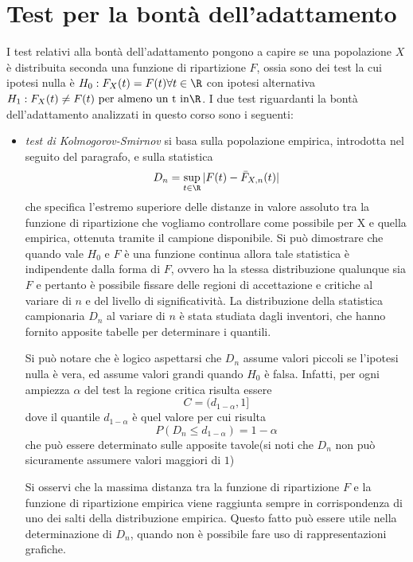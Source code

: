 \section{Test per la bontà dell'adattamento}
I test relativi alla bontà dell'adattamento pongono a capire se una popolazione $X$ è distribuita seconda una funzione
di ripartizione $F$, ossia sono dei test la cui ipotesi nulla è $H_0:F_X(t) = F(t) \forall t \in \R$ con ipotesi
alternativa $H_1:F_X(t) \neq F(t) \mbox{ per almeno un t in} \R$.\newline
I due test riguardanti la bontà dell'adattamento analizzati in questo corso sono i seguenti:
\begin{itemize}
    \item \emph{test di Kolmogorov-Smirnov} si basa sulla popolazione empirica, introdotta nel seguito del paragrafo, e
        sulla statistica
        \[ D_n = \sup _{t \in \R} |F(t) - \bar{F}_{X, n}(t)| \]
        che specifica l'estremo superiore delle distanze in valore assoluto tra la funzione di ripartizione che vogliamo
        controllare come possibile per X e quella empirica, ottenuta tramite il campione disponibile.\newline
        Si può dimostrare che quando vale $H_0$ e $F$ è una funzione continua allora tale statistica è indipendente 
        dalla forma di $F$, ovvero ha la stessa distribuzione qualunque sia $F$ e pertanto è possibile fissare delle 
        regioni di accettazione e critiche al variare di $n$ e del livello di significatività.\newline
        La distribuzione della statistica campionaria $D_n$ al variare di $n$ è stata studiata dagli inventori,
        che hanno fornito apposite tabelle per determinare i quantili.

        Si può notare che è logico aspettarsi che  $D_n$ assume valori piccoli se l’ipotesi nulla è vera, ed assume 
        valori grandi quando $H_0$ è falsa.\newline
        Infatti, per ogni ampiezza $\alpha$ del test la regione critica risulta essere
        \[ C = (d_{1 - \alpha}, 1] \]
        dove il quantile $d_{1 - \alpha}$ è quel valore per cui risulta 
        \[ P(D_n \leq d_{1 - \alpha}) = 1 - \alpha \]
        che può essere determinato sulle apposite tavole(si noti che $D_n$ non può sicuramente assumere valori maggiori di $1$)

        Si osservi che la massima distanza tra la funzione di ripartizione $F$ e la funzione di ripartizione empirica 
        viene raggiunta sempre in corrispondenza di uno dei salti della distribuzione empirica.\newline
        Questo fatto può essere utile nella determinazione di $D_n$, quando non è possibile fare uso di rappresentazioni grafiche.
        

\end{itemize}
